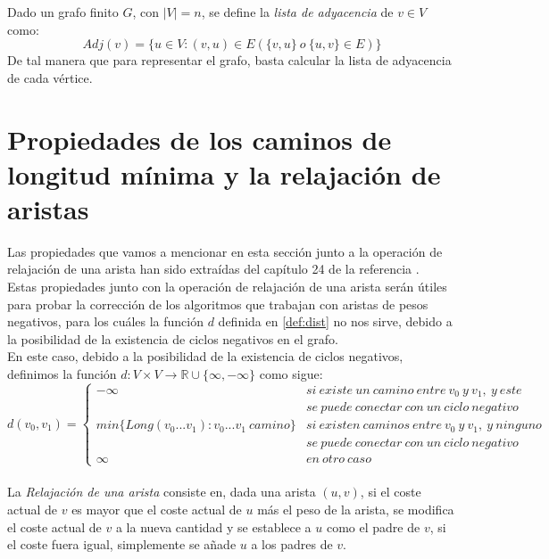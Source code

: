 \begin{definicion}
	Dado un grafo finito $G$, con $|V|=n$, se define la \textit{lista de adyacencia} de $v \in V$ como:
	$$Adj(v) = \{u \in V : (v,u)\in E (\{v,u\}\ o\ \{u,v\}\in E)\}$$
	De tal manera que para representar el grafo, basta calcular la lista de adyacencia de cada vértice.
\end{definicion}

\section{Propiedades de los caminos de longitud mínima y la relajación de aristas}

Las propiedades que vamos a mencionar en esta sección junto a la operación de relajación de una arista han sido extraídas del capítulo 24 de la referencia \cite{algorithms}. \\

Estas propiedades junto con la operación de relajación de una arista serán útiles para probar la corrección de los algoritmos que trabajan con aristas de pesos negativos, para los cuáles la función $d$ definida en \autoref{def:dist} no nos sirve, debido a la posibilidad de la existencia de ciclos negativos en el grafo. \\

En este caso, debido a la posibilidad de la existencia de ciclos negativos, definimos la función $d:V\times V \rightarrow \mathbb{R}\cup \{\infty,-\infty\}$ como sigue:
$$d(v_0,v_1)= \left\{ \begin{array}{lcc}
	-\infty & si\ existe\ un\ camino\ entre\ v_0\ y\ v_1,\ y\ este\\ & se\ puede\ conectar\ con\ un\ ciclo\ negativo
	\\ min\{Long(v_0...v_1) : v_0...v_1\ camino\} &   si\ existen\ caminos\ entre\ v_0\ y\ v_1,\ y\ ninguno\\ & se\ puede\ conectar\ con\ un\ ciclo\ negativo
	\\ \infty &  en\ otro\ caso
\end{array}
\right.$$ \\


La \textit{Relajación de una arista} consiste en, dada una arista $(u,v)$, si el coste actual de $v$ es mayor que el coste actual de $u$ más el peso de la arista, se modifica el coste actual de $v$ a la nueva cantidad y se establece a $u$ como el padre de $v$, si el coste fuera igual, simplemente se añade $u$ a los padres de $v$. \\


